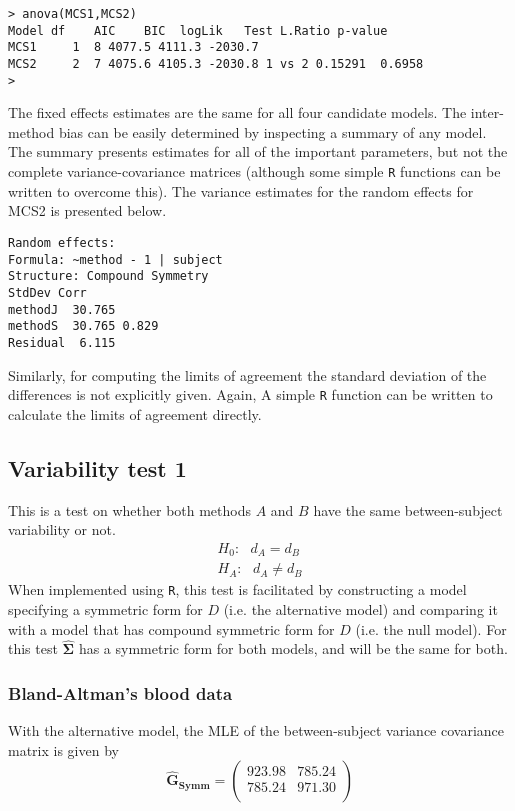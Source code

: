 \begin{framed}
\begin{verbatim}
> anova(MCS1,MCS2)
Model df    AIC    BIC  logLik   Test L.Ratio p-value
MCS1     1  8 4077.5 4111.3 -2030.7
MCS2     2  7 4075.6 4105.3 -2030.8 1 vs 2 0.15291  0.6958
>
\end{verbatim}
\end{framed}

The fixed effects estimates are the same for all four candidate models. The inter-method bias can be easily determined by inspecting a summary of any model. The summary presents estimates for all of the important parameters, but not the complete variance-covariance matrices (although some simple \texttt{R} functions can be written to overcome this). The variance estimates for the random effects for MCS2 is presented below.

\begin{verbatim}
Random effects:
Formula: ~method - 1 | subject
Structure: Compound Symmetry
StdDev Corr
methodJ  30.765
methodS  30.765 0.829
Residual  6.115
\end{verbatim}

Similarly, for computing the limits of agreement the standard deviation of the differences is not explicitly given. Again, A simple \texttt{R} function can be written to calculate the limits of agreement directly.

\subsection{Variability test 1}
This is a test on whether both methods $A$ and $B$ have the same between-subject variability or not.
\begin{eqnarray}
H_{0}: \mbox{ }d_{A}  = d_{B} \\
H_{A}: \mbox{ }d_{A}  \neq d_{B}
\end{eqnarray}
When implemented using \texttt{R}, this test is facilitated by constructing a model specifying a symmetric form for $D$ (i.e. the alternative model) and comparing it with a model that has compound symmetric form for $D$ (i.e. the null model). For this test $\boldsymbol{\hat{\Sigma}}$ has a symmetric form for both models, and will be the same for both.

\subsubsection{Bland-Altman's blood data}
With the alternative model, the MLE of the between-subject variance covariance matrix is given by
\begin{equation}
\boldsymbol{\hat{G}_{Symm}} = \left( \begin{array}{cc}
923.98 & 785.24  \\
785.24 & 971.30  \\
\end{array}\right)
\end{equation}

